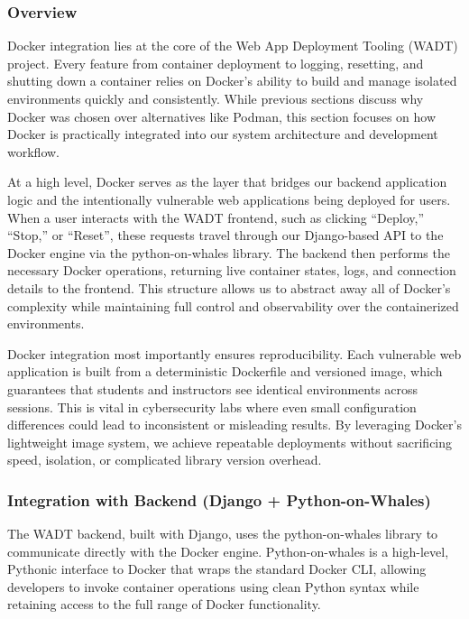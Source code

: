 \documentclass[12pt]{article}
\begin{document}
\subsubsection{Overview}
Docker integration lies at the core of the Web App Deployment Tooling (WADT) project. Every feature from container deployment to logging, resetting, and shutting down a container relies on Docker’s ability to build and manage isolated environments quickly and consistently. While previous sections discuss why Docker was chosen over alternatives like Podman, this section focuses on how Docker is practically integrated into our system architecture and development workflow.

At a high level, Docker serves as the layer that bridges our backend application logic and the intentionally vulnerable web applications being deployed for users. When a user interacts with the WADT frontend, such as clicking “Deploy,” “Stop,” or “Reset”, these requests travel through our Django-based API to the Docker engine via the python-on-whales library. The backend then performs the necessary Docker operations, returning live container states, logs, and connection details to the frontend. This structure allows us to abstract away all of Docker’s complexity while maintaining full control and observability over the containerized environments.

Docker integration most importantly ensures reproducibility. Each vulnerable web application is built from a deterministic Dockerfile and versioned image, which guarantees that students and instructors see identical environments across sessions. This is vital in cybersecurity labs where even small configuration differences could lead to inconsistent or misleading results. By leveraging Docker’s lightweight image system, we achieve repeatable deployments without sacrificing speed, isolation, or complicated library version overhead.


\subsubsection{Integration with Backend (Django + Python-on-Whales)}
The WADT backend, built with Django, uses the python-on-whales library to communicate directly with the Docker engine. Python-on-whales is a high-level, Pythonic interface to Docker that wraps the standard Docker CLI, allowing developers to invoke container operations using clean Python syntax while retaining access to the full range of Docker functionality. 
\end{document}
